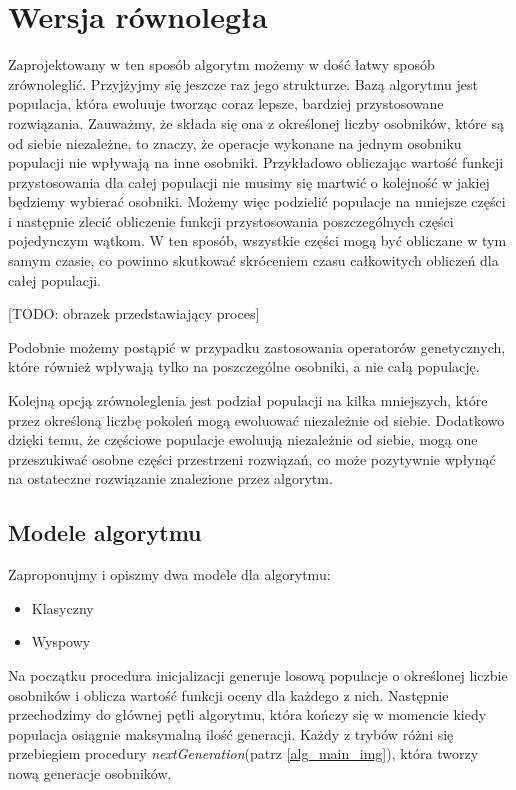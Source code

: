 \section{Wersja równoległa}

Zaprojektowany w ten sposób algorytm możemy w dość łatwy sposób zrównoleglić. Przyjżyjmy się jeszcze raz jego strukturze. Bazą algorytmu jest 
populacja, która ewoluuje tworząc coraz lepsze, bardziej przystosowane rozwiązania. Zauważmy, że składa się ona z określonej liczby osobników, 
które są od siebie niezależne, to znaczy, że operacje wykonane na jednym osobniku populacji nie wpływają na inne osobniki. Przykładowo 
obliczając wartość funkcji przystosowania dla całej populacji nie musimy się martwić o kolejność w jakiej będziemy wybierać osobniki. Możemy więc 
podzielić populacje na mniejsze części i następnie zlecić obliczenie funkcji przystosowania poszczególnych części pojedynczym wątkom. W ten 
sposób, wszystkie części mogą być obliczane w tym samym czasie, co powinno skutkować skróceniem czasu całkowitych obliczeń dla całej populacji.

[TODO: obrazek przedstawiający proces]

Podobnie możemy postąpić w przypadku zastosowania operatorów genetycznych, które również wpływają tylko na poszczególne osobniki, a nie całą 
populację.

Kolejną opcją zrównoleglenia jest podział populacji na kilka mniejszych, które przez określoną liczbę pokoleń mogą ewoluować niezależnie 
od siebie. Dodatkowo dzięki temu, że częściowe populacje ewoluują niezależnie od siebie, mogą one przeszukiwać osobne części przestrzeni 
rozwiązań, co może pozytywnie wpłynąć na ostateczne rozwiązanie znalezione przez algorytm\cite{ISLAND-MODEL-PERFORMANCE}.


\subsection{Modele algorytmu}

Zaproponujmy i opiszmy dwa modele dla algorytmu:
\begin{itemize}
    \item Klasyczny
    \item Wyspowy
\end{itemize}

Na początku procedura inicjalizacji generuje losową populacje o określonej liczbie osobników i oblicza wartość funkcji oceny dla każdego z nich. 
Następnie przechodzimy do głównej pętli algorytmu, która kończy się w momencie kiedy populacja osiągnie maksymalną ilość generacji. 
Każdy z trybów różni się przebiegiem procedury \textit{nextGeneration}(patrz \ref{alg_main_img}), która tworzy nową generacje osobników.

